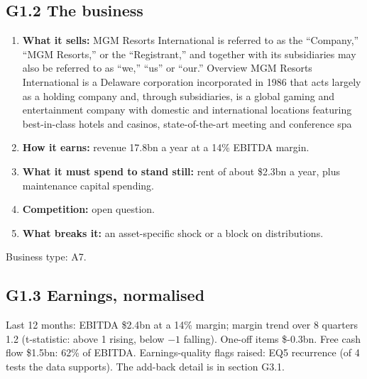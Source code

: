 \documentclass[11pt,a4paper]{article}
\begin{document}
\subsection*{G1.2 The business}
\begin{enumerate}
\item \textbf{What it sells:} MGM Resorts International is referred to as the “Company,” “MGM Resorts,” or the “Registrant,” and together with its subsidiaries may also be referred to as “we,” “us” or “our.” Overview MGM Resorts International is a Delaware corporation incorporated in 1986 that acts largely as a holding company and, through subsidiaries, is a global gaming and entertainment company with domestic and international locations featuring best-in-class hotels and casinos, state-of-the-art meeting and conference spa
\item \textbf{How it earns:} revenue 17.8bn a year at a 14\% EBITDA margin.
\item \textbf{What it must spend to stand still:} rent of about \$2.3bn a year, plus maintenance capital spending.
\item \textbf{Competition:} open question.
\item \textbf{What breaks it:} an asset-specific shock or a block on distributions.
\end{enumerate}
Business type: A7.
\subsection*{G1.3 Earnings, normalised}
Last 12 months: EBITDA \$2.4bn at a 14\% margin; margin trend over 8 quarters 1.2 (t-statistic: above 1 rising, below $-1$ falling). One-off items \$-0.3bn. Free cash flow \$1.5bn: 62\% of EBITDA. Earnings-quality flags raised: EQ5 recurrence (of 4 tests the data supports). The add-back detail is in section G3.1.
\end{document}
